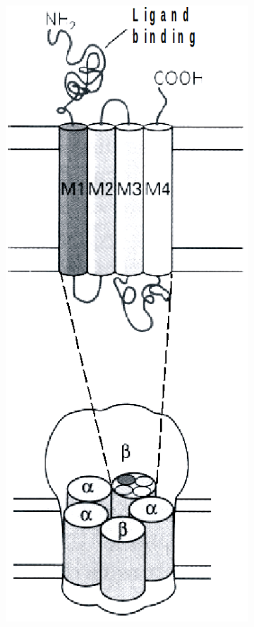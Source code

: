 \documentclass[10pt,a4paper]{report}
\begin{document}
\begin{figure}
    \centering
    \begin{subfigure}[b]{0.2\textwidth}
        \includegraphics[width=\textwidth]{Bilder/ligand2.png}

\end{subfigure}
\end{figure}
\end{document}
